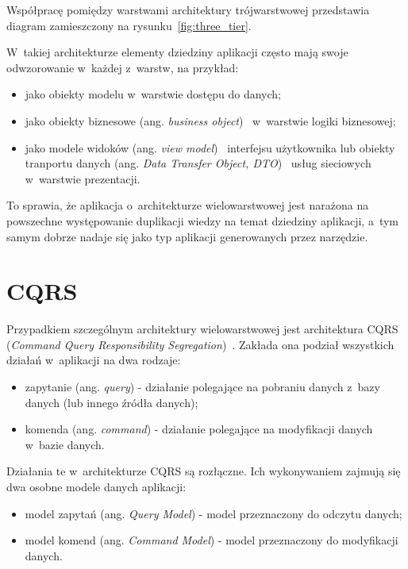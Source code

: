 Współpracę pomiędzy warstwami architektury trójwarstwowej przedstawia diagram zamieszczony na rysunku~\ref{fig:three_tier}.



W~takiej architekturze elementy dziedziny aplikacji często mają swoje odwzorowanie w~każdej z~warstw, na przykład:

\begin{itemize}
 \item jako obiekty modelu w~warstwie dostępu do danych;
 \item jako obiekty biznesowe (ang. \emph{business object})~\cite{business_object} w~warstwie logiki biznesowej;
 \item jako modele widoków (ang. \emph{view model})~\cite{view_model} interfejsu użytkownika lub obiekty tranportu danych (ang. \emph{Data Transfer Object, DTO})~\cite{dto} usług sieciowych w~warstwie prezentacji.
\end{itemize}

To sprawia, że aplikacja o~architekturze wielowarstwowej jest narażona na powszechne występowanie duplikacji wiedzy na temat dziedziny aplikacji, a~tym samym dobrze nadaje się jako typ aplikacji generowanych przez narzędzie.



\section{CQRS}

Przypadkiem szczególnym architektury wielowarstwowej jest architektura CQRS (\emph{Command Query Responsibility Segregation})~\cite{cqrs_journey}.
Zakłada ona podział wszystkich działań w~aplikacji na dwa rodzaje:

\begin{itemize}
 \item zapytanie (ang. \emph{query}) - działanie polegające na pobraniu danych z~bazy danych (lub innego źródła danych);
 \item komenda (ang. \emph{command}) - działanie polegające na modyfikacji danych w~bazie danych.
\end{itemize}

Działania te w~architekturze CQRS są rozłączne.
Ich wykonywaniem zajmują się dwa osobne modele danych aplikacji:

\begin{itemize}
 \item model zapytań (ang. \emph{Query Model}) - model przeznaczony do odczytu danych;
 \item model komend (ang. \emph{Command Model}) - model przeznaczony do modyfikacji danych.
\end{itemize}

